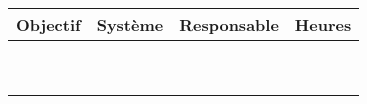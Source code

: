 \begin{tabularx}{\linewidth}{
    |>{\hsize=2.5\hsize}X|%
    >{\hsize=0.5\hsize}X|%
    >{\hsize=0.75\hsize}X|%
    >{\hsize=0.25\hsize}X|%
  }
    \hline
    \textbf{Objectif} & \textbf{Système} & \textbf{Responsable} & \textbf{Heures}\\\hline
      &   &   &  \\\hline
      &   &   &  \\\hline
      &   &   &  \\\hline
      &   &   &  \\\hline
      &   &   &  \\\hline
      &   &   &  \\\hline
      &   &   &  \\\hline
      &   &   &  \\\hline
      &   &   &  \\\hline
  \end{tabularx}
     